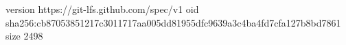 version https://git-lfs.github.com/spec/v1
oid sha256:cb87053851217c3011717aa005dd81955dfc9639a3c4ba4fd7cfa127b8bd7861
size 2498
